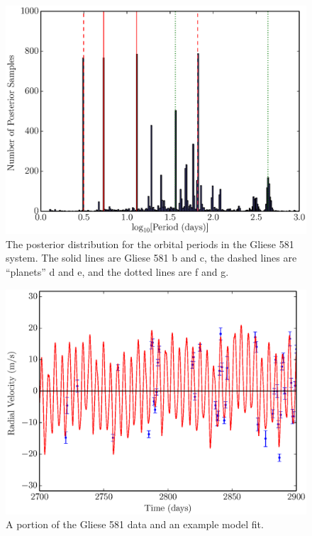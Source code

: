\documentclass[useAMS,usenatbib]{mn2e}
\begin{document}
\begin{figure}
\includegraphics[scale=0.45]{Figures/gliese581_periods.eps}
\caption{The posterior distribution for the orbital periods in the Gliese 581
system. The solid lines are Gliese 581 b and c, the dashed lines are
``planets'' d and e, and the dotted lines are f and g.
\label{fig:gliese581_periods}}
\end{figure}


\begin{figure}
\includegraphics[scale=0.45]{Figures/gliese581.eps}
\caption{A portion of the Gliese 581 data and an example model fit.
\label{fig:gliese581}}
\end{figure}
\end{document}
